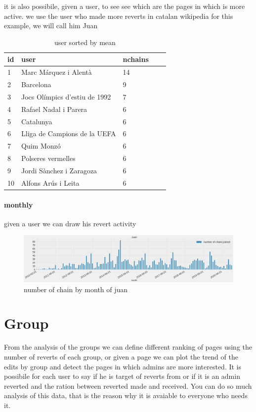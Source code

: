 it is also possibile, given a user, to see see which are the pages in which is more active. we use
the user who made more reverts in catalan wikipedia for this example, we will call him Juan

\begin{table}[H]
    \centering
    \begin{tabularx}{\columnwidth}{@{}Xllll@{}}
        \midrule
        \textbf{id}& \textbf{user} & \textbf{nchains}  \\ \toprule
        1 & Marc Márquez i Alentà & 14  \\
        2 & Barcelona & 9   \\
        3 & Jocs Olímpics d'estiu de 1992 & 7   \\
        4 & Rafael Nadal i Parera & 6  \\
        5 & Catalunya &  6 \\
        6 & Lliga de Campions de la UEFA	 &  6 \\
        7 & Quim Monzó &  6 \\
        8 & Polseres vermelles &  6 \\
        9 & Jordi Sànchez i Zaragoza &  6 \\
        10 & Alfons Arús i Leita &  6\\

        
         \bottomrule
    \end{tabularx}
    
    \caption{user sorted by mean \label{table:mean}}
\end{table}
\paragraph*{monthly}
given a user we can draw his revert activity
\begin{figure}[H]
    \centering
    \includegraphics[width=\textwidth]{./chapters/04/assets/chains_user_month.png}
    \caption{number of chain by month of juan}
    \label{fig:chainsusermonth}
\end{figure}

\section{Group}
From the analysis of the groups we can define different ranking of pages using the number of reverts
of each group, or given a page we can plot the trend of the edits by group and detect the pages in
which admins are more interested. It is possibile for each user to say if he is target of reverts
from or if it is an admin reverted and the ration between reverted made and received. You can do so
much analysis of this data, that is the reason why it is avaiable to everyone who needs it. 

